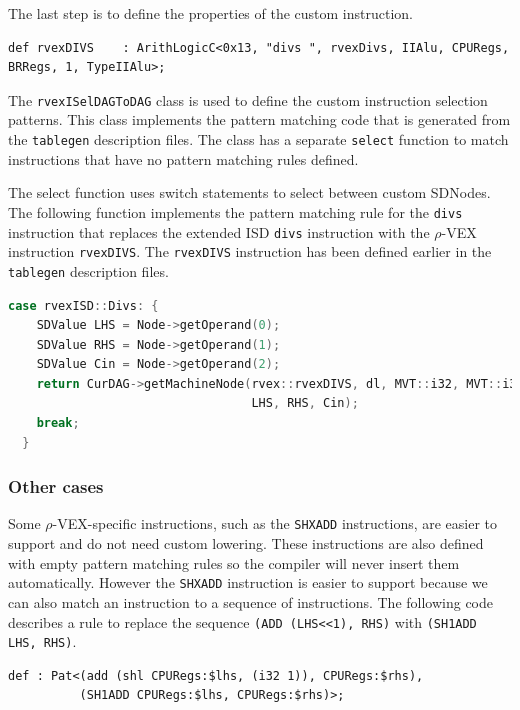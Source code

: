 The last step is to define the properties of the custom instruction.

\begin{lstlisting}[language=tblgen]
def rvexDIVS    : ArithLogicC<0x13, "divs ", rvexDivs, IIAlu, CPURegs, BRRegs, 1, TypeIIAlu>;
\end{lstlisting}

The \texttt{rvexISelDAGToDAG} class is used to define the custom instruction selection patterns. This class implements the pattern matching code that is generated from the \texttt{tablegen} description files. The class has a separate \texttt{select} function to match instructions that have no pattern matching rules defined.

The select function uses switch statements to select between custom SDNodes. The following function implements the pattern matching rule for the \texttt{divs} instruction that replaces the extended ISD \texttt{divs} instruction with the $\rho$-VEX instruction \texttt{rvexDIVS}. The \texttt{rvexDIVS} instruction has been defined earlier in the \texttt{tablegen} description files.

\begin{lstlisting}[language=C++]   
  case rvexISD::Divs: {
    SDValue LHS = Node->getOperand(0);
    SDValue RHS = Node->getOperand(1);
    SDValue Cin = Node->getOperand(2);
    return CurDAG->getMachineNode(rvex::rvexDIVS, dl, MVT::i32, MVT::i32,
                                  LHS, RHS, Cin);
    break;
  }
\end{lstlisting}

\subsubsection{Other cases}
Some $\rho$-VEX-specific instructions, such as the \texttt{SHXADD} instructions, are easier to support and do not need custom lowering. These instructions are also defined with empty pattern matching rules so the compiler will never insert them automatically. However the \texttt{SHXADD} instruction is easier to support because we can also match an instruction to a sequence of instructions. The following code describes a rule to replace the sequence \texttt{(ADD (LHS\textless\textless1), RHS)} with \texttt{(SH1ADD LHS, RHS)}.

\begin{lstlisting}[language=tblgen]
def : Pat<(add (shl CPURegs:$lhs, (i32 1)), CPURegs:$rhs),
          (SH1ADD CPURegs:$lhs, CPURegs:$rhs)>;
\end{lstlisting}


